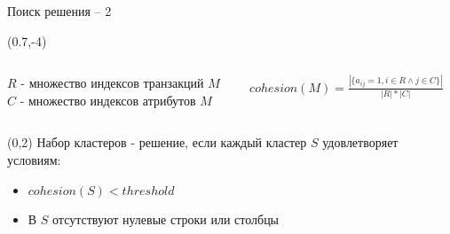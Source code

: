 \documentclass[10pt, dvipsnames]{beamer}
\begin{document}
\begin{frame}{Поиск решения -- 2}
	\begin{textblock}{13}(0.7,-4)
		\begin{columns}
			\begin{column}{0.47\textwidth}
	$R$ - множество индексов транзакций $M$\\[0.2cm]
	$C$ - множество индексов атрибутов $M$
			\end{column}
			\begin{column}{0.6\textwidth}
	$cohesion(M) = \displaystyle\frac{|\{a_{ij} = 1, i \in R \land j \in C\}|}{|R|*|C|}$
			\end{column}
		\end{columns}
	\end{textblock}
	\begin{textblock}{13}(0,2)
	Набор кластеров - решение, если каждый кластер $S$ удовлетворяет условиям: 
		\begin{itemize}
		\item $cohesion(S) < threshold$
		\item В $S$ отсутствуют нулевые строки или столбцы
		\end{itemize} 
	\end{textblock}
\end{frame}
\end{document}

